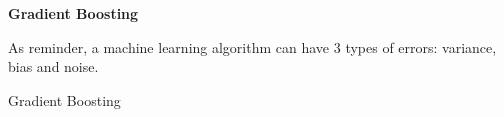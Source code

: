 \textbf{Gradient Boosting}

As reminder, a machine learning algorithm can have 3 types of errors: variance, bias and noise.

Gradient Boosting 